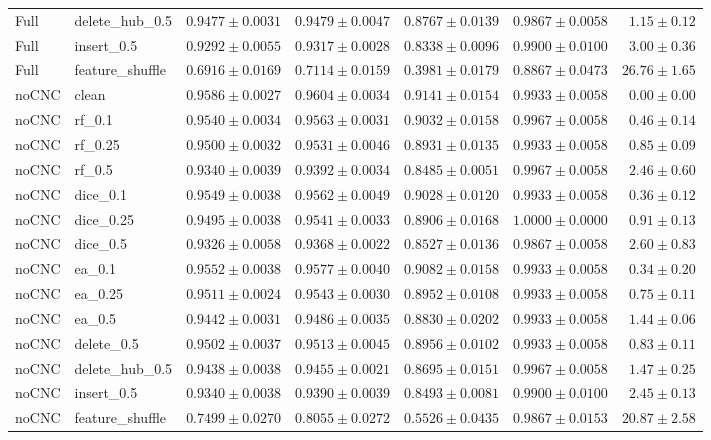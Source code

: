 \documentclass[UTF8,a4paper,11pt,fontset=fandol]{ctexart}
\begin{document}
{\begin{longtable}{llrrrrr}
Full & delete\_hub\_0.5 & $0.9477\pm0.0031$ & $0.9479\pm0.0047$ & $0.8767\pm0.0139$ & $0.9867\pm0.0058$ & $1.15\pm0.12$ \\
Full & insert\_0.5 & $0.9292\pm0.0055$ & $0.9317\pm0.0028$ & $0.8338\pm0.0096$ & $0.9900\pm0.0100$ & $3.00\pm0.36$ \\
Full & feature\_shuffle & $0.6916\pm0.0169$ & $0.7114\pm0.0159$ & $0.3981\pm0.0179$ & $0.8867\pm0.0473$ & $26.76\pm1.65$ \\
noCNC & clean & $0.9586\pm0.0027$ & $0.9604\pm0.0034$ & $0.9141\pm0.0154$ & $0.9933\pm0.0058$ & $0.00\pm0.00$ \\
noCNC & rf\_0.1 & $0.9540\pm0.0034$ & $0.9563\pm0.0031$ & $0.9032\pm0.0158$ & $0.9967\pm0.0058$ & $0.46\pm0.14$ \\
noCNC & rf\_0.25 & $0.9500\pm0.0032$ & $0.9531\pm0.0046$ & $0.8931\pm0.0135$ & $0.9933\pm0.0058$ & $0.85\pm0.09$ \\
noCNC & rf\_0.5 & $0.9340\pm0.0039$ & $0.9392\pm0.0034$ & $0.8485\pm0.0051$ & $0.9967\pm0.0058$ & $2.46\pm0.60$ \\
noCNC & dice\_0.1 & $0.9549\pm0.0038$ & $0.9562\pm0.0049$ & $0.9028\pm0.0120$ & $0.9933\pm0.0058$ & $0.36\pm0.12$ \\
noCNC & dice\_0.25 & $0.9495\pm0.0038$ & $0.9541\pm0.0033$ & $0.8906\pm0.0168$ & $1.0000\pm0.0000$ & $0.91\pm0.13$ \\
noCNC & dice\_0.5 & $0.9326\pm0.0058$ & $0.9368\pm0.0022$ & $0.8527\pm0.0136$ & $0.9867\pm0.0058$ & $2.60\pm0.83$ \\
noCNC & ea\_0.1 & $0.9552\pm0.0038$ & $0.9577\pm0.0040$ & $0.9082\pm0.0158$ & $0.9933\pm0.0058$ & $0.34\pm0.20$ \\
noCNC & ea\_0.25 & $0.9511\pm0.0024$ & $0.9543\pm0.0030$ & $0.8952\pm0.0108$ & $0.9933\pm0.0058$ & $0.75\pm0.11$ \\
noCNC & ea\_0.5 & $0.9442\pm0.0031$ & $0.9486\pm0.0035$ & $0.8830\pm0.0202$ & $0.9933\pm0.0058$ & $1.44\pm0.06$ \\
noCNC & delete\_0.5 & $0.9502\pm0.0037$ & $0.9513\pm0.0045$ & $0.8956\pm0.0102$ & $0.9933\pm0.0058$ & $0.83\pm0.11$ \\
noCNC & delete\_hub\_0.5 & $0.9438\pm0.0038$ & $0.9455\pm0.0021$ & $0.8695\pm0.0151$ & $0.9967\pm0.0058$ & $1.47\pm0.25$ \\
noCNC & insert\_0.5 & $0.9340\pm0.0038$ & $0.9390\pm0.0039$ & $0.8493\pm0.0081$ & $0.9900\pm0.0100$ & $2.45\pm0.13$ \\
noCNC & feature\_shuffle & $0.7499\pm0.0270$ & $0.8055\pm0.0272$ & $0.5526\pm0.0435$ & $0.9867\pm0.0153$ & $20.87\pm2.58$ \\

\end{longtable}}
\end{document}
